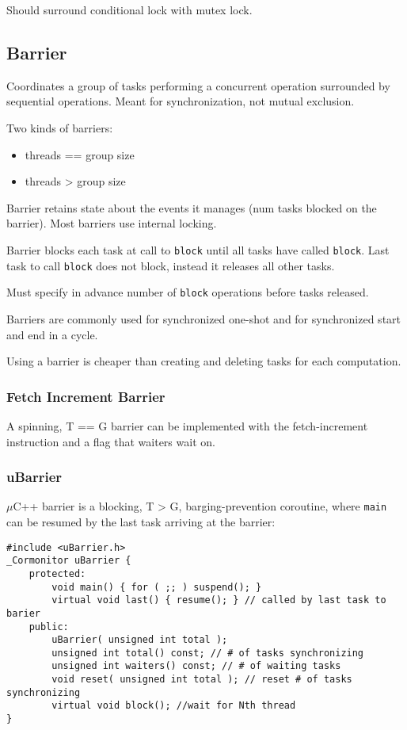 \documentclass[11pt]{article}
\begin{document}
Should surround conditional lock with mutex lock.
\subsection{Barrier}
\label{sec:org9ced8b3}
Coordinates a group of tasks performing a concurrent operation surrounded by sequential
operations.
Meant for synchronization, not mutual exclusion.

Two kinds of barriers:
\begin{itemize}
\item threads == group size
\item threads > group size
\end{itemize}

Barrier retains state about the events it manages (num tasks blocked on the barrier).
Most barriers use internal locking.

Barrier blocks each task at call to \texttt{block} until all tasks have called \texttt{block}.
Last task to call \texttt{block} does not block, instead it releases all other tasks.

Must specify in advance number of \texttt{block} operations before tasks released.

Barriers are commonly used for synchronized one-shot and for synchronized start
and end in a cycle.

Using a barrier is cheaper than creating and deleting tasks for each computation.
\subsubsection{Fetch Increment Barrier}
\label{sec:orgf7fc1a8}
A spinning, T == G barrier can be implemented with the fetch-increment instruction
and a flag that waiters wait on.
\subsubsection{uBarrier}
\label{sec:orgb7685ae}
\(\mu\)C++ barrier is a blocking, T > G, barging-prevention coroutine, where \texttt{main}
can be resumed by the last task arriving at the barrier:
\begin{verbatim}
#include <uBarrier.h>
_Cormonitor uBarrier {
    protected:
        void main() { for ( ;; ) suspend(); }
        virtual void last() { resume(); } // called by last task to barier
    public:
        uBarrier( unsigned int total );
        unsigned int total() const; // # of tasks synchronizing
        unsigned int waiters() const; // # of waiting tasks
        void reset( unsigned int total ); // reset # of tasks synchronizing
        virtual void block(); //wait for Nth thread
}
\end{verbatim}
\end{document}
